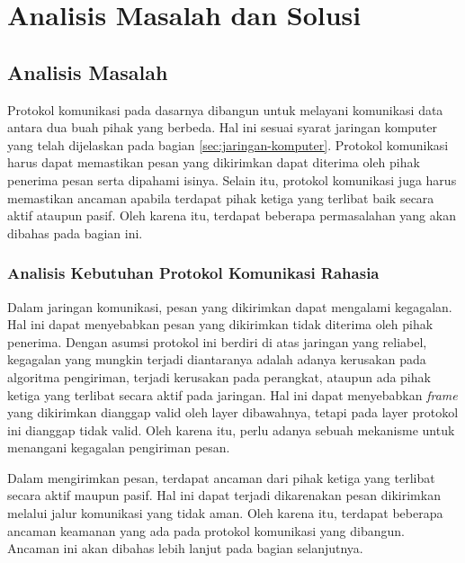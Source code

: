 

\chapter{Analisis Masalah dan Solusi}

\section{Analisis Masalah}
\label{sec:analisis-masalah}

Protokol komunikasi pada dasarnya dibangun untuk melayani komunikasi data antara dua buah pihak yang berbeda. Hal ini sesuai syarat jaringan komputer yang telah dijelaskan pada bagian \ref{sec:jaringan-komputer}. Protokol komunikasi harus dapat memastikan pesan yang dikirimkan dapat diterima oleh pihak penerima pesan serta dipahami isinya. Selain itu, protokol komunikasi juga harus memastikan ancaman apabila terdapat pihak ketiga yang terlibat baik secara aktif ataupun pasif. Oleh karena itu, terdapat beberapa permasalahan yang akan dibahas pada bagian ini.

\subsection{Analisis Kebutuhan Protokol Komunikasi Rahasia}

Dalam jaringan komunikasi, pesan yang dikirimkan dapat mengalami kegagalan. Hal ini dapat menyebabkan pesan yang dikirimkan tidak diterima oleh pihak penerima. Dengan asumsi protokol ini berdiri di atas jaringan yang reliabel, kegagalan yang mungkin terjadi diantaranya adalah adanya kerusakan pada algoritma pengiriman, terjadi kerusakan pada perangkat, ataupun ada pihak ketiga yang terlibat secara aktif pada jaringan. Hal ini dapat menyebabkan \emph{frame} yang dikirimkan dianggap valid oleh layer dibawahnya, tetapi pada layer protokol ini dianggap tidak valid. Oleh karena itu, perlu adanya sebuah mekanisme untuk menangani kegagalan pengiriman pesan.

Dalam mengirimkan pesan, terdapat ancaman dari pihak ketiga yang terlibat secara aktif maupun pasif. Hal ini dapat terjadi dikarenakan pesan dikirimkan melalui jalur komunikasi yang tidak aman. Oleh karena itu, terdapat beberapa ancaman keamanan yang ada pada protokol komunikasi yang dibangun. Ancaman ini akan dibahas lebih lanjut pada bagian selanjutnya.

